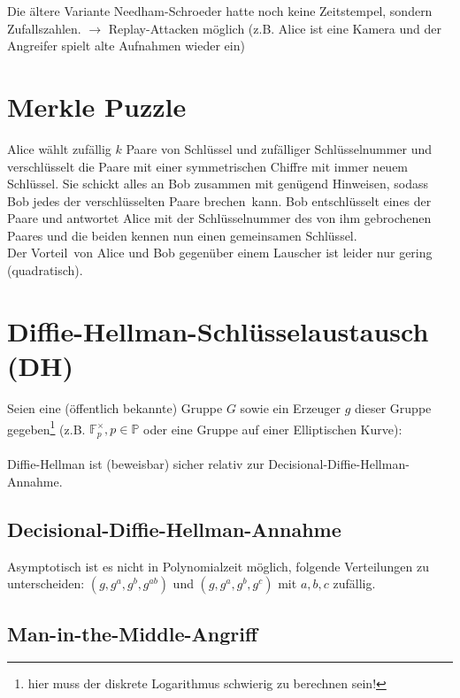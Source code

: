 \documentclass[a4paper,twoside,DIV15,BCOR12mm]{scrbook}
\begin{document}
Die ältere Variante Needham-Schroeder hatte noch keine Zeitstempel, sondern Zufallszahlen. $\rightarrow$ Replay-Attacken möglich (z.B. Alice ist eine Kamera und der Angreifer spielt alte Aufnahmen wieder ein)

\section{Merkle Puzzle}

Alice wählt zufällig $k$ Paare von Schlüssel und zufälliger Schlüsselnummer und verschlüsselt die Paare mit einer symmetrischen Chiffre mit immer neuem Schlüssel. Sie schickt alles an Bob zusammen mit genügend Hinweisen, sodass Bob jedes der verschlüsselten Paare \glqq brechen\grqq\ kann. Bob entschlüsselt eines der Paare und antwortet Alice mit der Schlüsselnummer des von ihm gebrochenen Paares und die beiden kennen nun einen gemeinsamen Schlüssel.\\ Der \glqq Vorteil\grqq\ von Alice und Bob gegenüber einem Lauscher ist leider nur gering (quadratisch).

\section{Diffie-Hellman-Schlüsselaustausch (DH)}

Seien eine (öffentlich bekannte) Gruppe $G$ sowie ein Erzeuger $g$ dieser Gruppe gegeben\footnote{hier muss der diskrete Logarithmus schwierig zu berechnen sein!} (z.B. $\mathbb{F}_p^\times, p \in \mathbb{P}$ oder eine Gruppe auf einer Elliptischen Kurve):\\

\\

Diffie-Hellman ist (beweisbar) sicher relativ zur Decisional-Diffie-Hellman-Annahme.

\subsection{Decisional-Diffie-Hellman-Annahme}

Asymptotisch ist es nicht in Polynomialzeit möglich, folgende Verteilungen zu unterscheiden: $(g, g^a, g^b, g^{ab})$ und $(g, g^a, g^b, g^c)$ mit $a, b, c$ zufällig.

\subsection{Man-in-the-Middle-Angriff}
\end{document}
